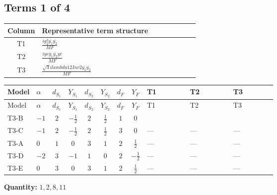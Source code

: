 \documentclass[8pt]{article}
\begin{document}
\begin{landscape}
\subsection*{Terms 1 of 4}
\begin{center}
\begin{tabular}{@{}c >{\raggedright\arraybackslash}p{0.82\linewidth}@{}}
\toprule
Column & Representative term structure \\
\midrule
T1 & \(\displaystyle \frac{i g_{2}^{2} \overline{y_{1}} \overline{y_{2}}}{MF}\) \\
\midrule
T2 & \(\displaystyle \frac{i ye \overline{y_{1}} \overline{y_{2}} \overline{ye}}{MF}\) \\
\midrule
T3 & \(\displaystyle \frac{\sqrt{3} i lambda12Inv2 \overline{y_{1}} \overline{y_{2}}}{MF}\) \\
\midrule
\bottomrule
\end{tabular}
\end{center}
\smallskip
\tiny
\begin{longtable}{@{}llcccccc >{\raggedright\arraybackslash}p{0.21\linewidth} >{\raggedright\arraybackslash}p{0.21\linewidth} >{\raggedright\arraybackslash}p{0.21\linewidth}@{}}
\toprule
Model & $\alpha$ & $d_{S_1}$ & $Y_{S_1}$ & $d_{S_2}$ & $Y_{S_2}$ & $d_F$ & $Y_F$ & T1 & T2 & T3 \\
\midrule
\endfirsthead
\toprule
Model & $\alpha$ & $d_{S_1}$ & $Y_{S_1}$ & $d_{S_2}$ & $Y_{S_2}$ & $d_F$ & $Y_F$ & T1 & T2 & T3 \\
\midrule
\endhead
T3-B & $-1$ & $2$ & $-\frac{1}{2}$ & $2$ & $\frac{1}{2}$ & $1$ & $0$ & \scriptsize\adjustbox{max width=\linewidth}{$\begin{gathered} \frac{3 i g_{2}^{2} \overline{y_{1}} \overline{y_{2}}}{8 MF}\end{gathered}$} & \scriptsize\adjustbox{max width=\linewidth}{$\begin{gathered} - \frac{i ye \overline{y_{1}} \overline{y_{2}} \overline{ye}}{8 MF}\end{gathered}$} & \scriptsize\adjustbox{max width=\linewidth}{$\begin{gathered} \frac{\sqrt{3} i lambda12Inv2 \overline{y_{1}} \overline{y_{2}}}{6 MF}\end{gathered}$} \\
\midrule
T3-C & $-1$ & $2$ & $-\frac{1}{2}$ & $2$ & $\frac{1}{2}$ & $3$ & $0$ & --- & --- & --- \\
\midrule
T3-A & $0$ & $1$ & $0$ & $3$ & $1$ & $2$ & $\frac{1}{2}$ & --- & --- & --- \\
\midrule
T3-D & $-2$ & $3$ & $-1$ & $1$ & $0$ & $2$ & $-\frac{1}{2}$ & --- & --- & --- \\
\midrule
T3-E & $0$ & $3$ & $0$ & $3$ & $1$ & $2$ & $\frac{1}{2}$ & --- & --- & --- \\
\midrule
\bottomrule
\end{longtable}
\clearpage
\noindent\textbf{Quantity: }$\mathrm{1,2,8,11}$\par\smallskip

\end{landscape}
\end{document}
